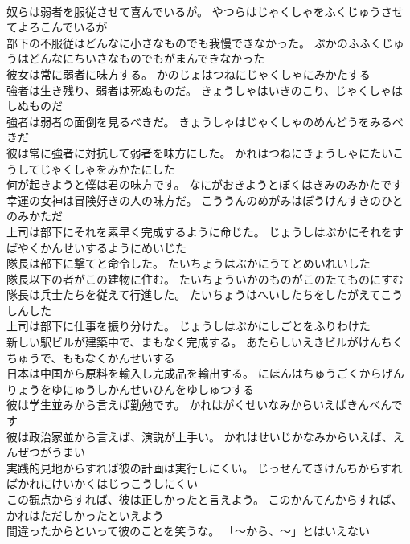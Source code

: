 \documentclass[8pt]{extreport}
\begin{document}
\begin{CJK}{UTF8}{min}
\\	奴らは弱者を服従させて喜んでいるが。	やつらはじゃくしゃをふくじゅうさせてよろこんでいるが 
\\	部下の不服従はどんなに小さなものでも我慢できなかった。	ぶかのふふくじゅうはどんなにちいさなものでもがまんできなかった 
\\	彼女は常に弱者に味方する。	かのじょはつねにじゃくしゃにみかたする 
\\	強者は生き残り、弱者は死ぬものだ。	きょうしゃはいきのこり、じゃくしゃはしぬものだ 
\\	強者は弱者の面倒を見るべきだ。	きょうしゃはじゃくしゃのめんどうをみるべきだ 
\\	彼は常に強者に対抗して弱者を味方にした。	かれはつねにきょうしゃにたいこうしてじゃくしゃをみかたにした 
\\	何が起きようと僕は君の味方です。	なにがおきようとぼくはきみのみかたです 
\\	幸運の女神は冒険好きの人の味方だ。	こううんのめがみはぼうけんすきのひとのみかただ 
\\	上司は部下にそれを素早く完成するように命じた。	じょうしはぶかにそれをすばやくかんせいするようにめいじた 
\\	隊長は部下に撃てと命令した。	たいちょうはぶかにうてとめいれいした 
\\	隊長以下の者がこの建物に住む。	たいちょういかのものがこのたてものにすむ 
\\	隊長は兵士たちを従えて行進した。	たいちょうはへいしたちをしたがえてこうしんした 
\\	上司は部下に仕事を振り分けた。	じょうしはぶかにしごとをふりわけた 
\\	新しい駅ビルが建築中で、まもなく完成する。	あたらしいえきビルがけんちくちゅうで、ももなくかんせいする 
\\	日本は中国から原料を輸入し完成品を輸出する。	にほんはちゅうごくからげんりょうをゆにゅうしかんせいひんをゆしゅつする 
\\	彼は学生並みから言えば勤勉です。	かれはがくせいなみからいえばきんべんです 
\\	彼は政治家並から言えば、演説が上手い。	かれはせいじかなみからいえば、えんぜつがうまい 
\\	実践的見地からすれば彼の計画は実行しにくい。	じっせんてきけんちからすればかれにけいかくはじっこうしにくい 
\\	この観点からすれば、彼は正しかったと言えよう。	このかんてんからすれば、かれはただしかったといえよう 
\\	間違ったからといって彼のことを笑うな。	「～から、～」とはいえない

\end{CJK}
\end{document}
